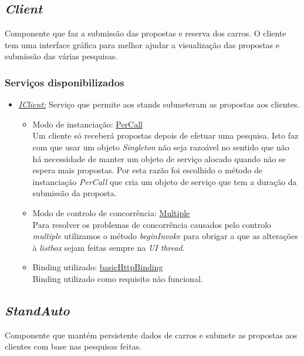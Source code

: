 \documentclass[a4paper]{article}
\begin{document}
\subsection{\emph{Client}}
Componente que faz a submissão das propostas e reserva dos carros. O cliente tem uma interface gráfica para melhor ajudar a visualização das propostas e submissão das várias pesquisas.
\subsubsection{Serviços disponibilizados}
\begin{itemize} 

\item
\emph{\underline{IClient:}}
Serviço que permite aos stands submeteram as propostas aos clientes.
	\begin{itemize}
		\item
		Modo de instanciação: \underline{PerCall}\\
		Um cliente só receberá propostas depois de efetuar uma pesquisa. Isto faz com que usar um objeto \emph{Singleton} não seja razoável no sentido que não há necessidade de manter um objeto de serviço alocado quando não se espera mais propostas. Por esta razão foi escolhido o método de instanciação \emph{PerCall} que cria um objeto de serviço que tem a duração da submissão da proposta.
		\item
		Modo de controlo de concorrência: \underline{Multiple}\\
		Para resolver os problemas de concorrência causados pelo controlo \emph{multiple} utilizamos o método \emph{beginInvoke} para obrigar a que as alterações à \emph{listbox} sejam feitas sempre na \emph{UI thread}.
		
		\item
		Binding utilizado: \underline{basicHttpBinding}\\
		Binding utilizado como requisito não funcional.
	\end{itemize}
\end{itemize}


\subsection{\emph{StandAuto}}
Componente que mantém persistente dados de carros e submete as propostas aos clientes com base nas pesquisas feitas.
\end{document}
